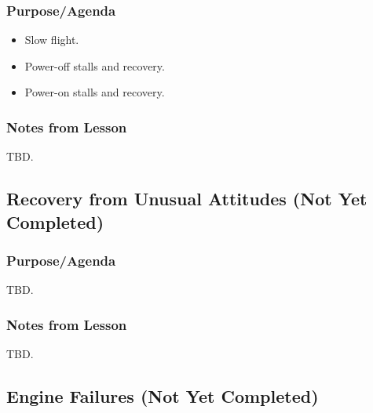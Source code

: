 \documentclass[letterpaper,10pt,titlepage]{article}
\begin{document}
\subsubsection{Purpose/Agenda}
\label{sfle0:ssfs0:spov0}

\begin{itemize}
\item Slow flight.
\item Power-off stalls and recovery.
\item Power-on stalls and recovery.
\end{itemize}


\subsubsection{Notes from Lesson}
\label{sfle0:ssfs0:snff0}

TBD.



\subsection{Recovery from Unusual Attitudes (Not Yet Completed)}
\label{sfle0:srua0}



\subsubsection{Purpose/Agenda}
\label{sfle0:srua0:spov0}

TBD.


\subsubsection{Notes from Lesson}
\label{sfle0:srua0:snff0}

TBD.



\subsection{Engine Failures (Not Yet Completed)}
\label{sfle0:sefa0}
\end{document}
